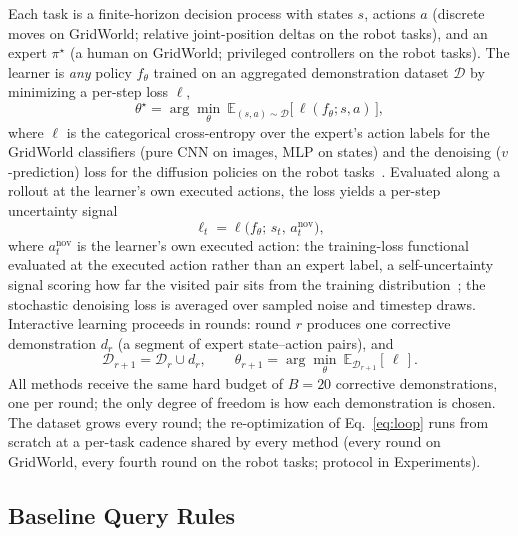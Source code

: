 \documentclass[letterpaper]{article} %
\begin{document}
Each task is a finite-horizon decision process with states $s$, actions $a$
(discrete moves on GridWorld; relative joint-position deltas on the robot
tasks), and an expert $\pi^\star$ (a human on GridWorld; privileged
controllers on the robot tasks). The learner is \emph{any}
policy $f_\theta$ trained on an aggregated demonstration dataset
$\mathcal{D}$ by minimizing a per-step loss $\ell$,
\begin{equation}
\theta^\star=\arg\min_{\theta}\
\mathbb{E}_{(s,a)\sim\mathcal{D}}\big[\,\ell(f_\theta;s,a)\,\big],
\label{eq:il}
\end{equation}
where $\ell$ is the categorical cross-entropy over the expert's action labels
for the GridWorld classifiers (pure CNN on images, MLP on states) and the
denoising ($v$-prediction) loss for the diffusion policies on the robot
tasks~\citep{ho2020ddpm,chi2023diffusionpolicy}.
Evaluated along a rollout at the learner's own executed actions, the loss
yields a per-step uncertainty signal
\begin{equation}
\ell_t=\ell\big(f_\theta;\,s_t,\,a^{\mathrm{nov}}_t\big),
\label{eq:signal}
\end{equation}
where $a^{\mathrm{nov}}_t$ is the learner's own executed action: the
training-loss functional evaluated at the executed action rather than an
expert label, a self-uncertainty signal scoring how far the visited pair
sits from the training distribution~\citep{lee2025diffdagger}; the
stochastic denoising loss is averaged over sampled noise and timestep
draws. Interactive learning proceeds in
rounds: round $r$ produces one corrective demonstration $d_r$ (a segment of
expert state--action pairs), and
\begin{equation}
\mathcal{D}_{r+1}=\mathcal{D}_r\cup d_r,
\qquad
\theta_{r+1}=\arg\min_{\theta}\
\mathbb{E}_{\mathcal{D}_{r+1}}[\,\ell\,].
\label{eq:loop}
\end{equation}
All methods receive the same hard budget of $B{=}20$ corrective
demonstrations, one per round; the only degree of freedom is how each
demonstration is chosen. The dataset grows every round; the re-optimization
of Eq.~\ref{eq:loop} runs from scratch at a per-task cadence shared by
every method (every round on GridWorld, every fourth round on the robot
tasks; protocol in Experiments).

\subsection{Baseline Query Rules}
\label{sec:unified}
\end{document}

